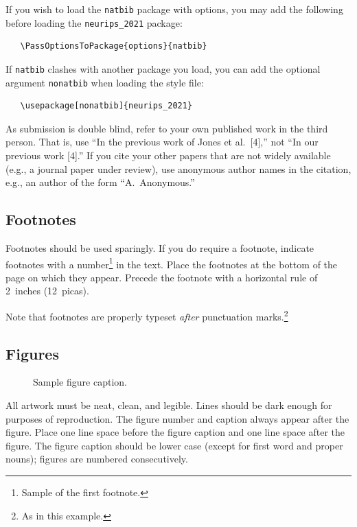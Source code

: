 \documentclass{article}
\begin{document}
If you wish to load the \verb+natbib+ package with options, you may add the
following before loading the \verb+neurips_2021+ package:
\begin{verbatim}
   \PassOptionsToPackage{options}{natbib}
\end{verbatim}

If \verb+natbib+ clashes with another package you load, you can add the optional
argument \verb+nonatbib+ when loading the style file:
\begin{verbatim}
   \usepackage[nonatbib]{neurips_2021}
\end{verbatim}

As submission is double blind, refer to your own published work in the third
person. That is, use ``In the previous work of Jones et al.\ [4],'' not ``In our
previous work [4].'' If you cite your other papers that are not widely available
(e.g., a journal paper under review), use anonymous author names in the
citation, e.g., an author of the form ``A.\ Anonymous.''

\subsection{Footnotes}

Footnotes should be used sparingly.  If you do require a footnote, indicate
footnotes with a number\footnote{Sample of the first footnote.} in the
text. Place the footnotes at the bottom of the page on which they appear.
Precede the footnote with a horizontal rule of 2~inches (12~picas).

Note that footnotes are properly typeset \emph{after} punctuation
marks.\footnote{As in this example.}

\subsection{Figures}

\begin{figure}
  \centering
  \fbox{\rule[-.5cm]{0cm}{4cm} \rule[-.5cm]{4cm}{0cm}}
  \caption{Sample figure caption.}
\end{figure}

All artwork must be neat, clean, and legible. Lines should be dark enough for
purposes of reproduction. The figure number and caption always appear after the
figure. Place one line space before the figure caption and one line space after
the figure. The figure caption should be lower case (except for first word and
proper nouns); figures are numbered consecutively.
\end{document}
